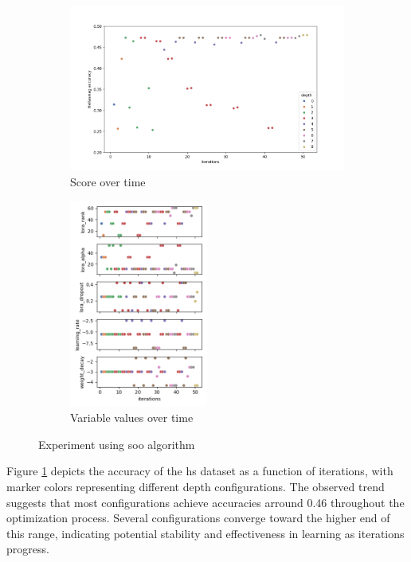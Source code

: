 \begin{figure}[h!]
    \centering
    \begin{subfigure}[b]{.5\textwidth}
      \centering
      \includegraphics[width = \textwidth]{figures/soo/score_evolution.png}
      \caption{Score over time}
      \label{fig:soo_score_time}
    \end{subfigure}%
    \begin{subfigure}[b]{.4\textwidth}
      \centering
      \includegraphics[width = 0.5\textwidth]{figures/soo/variables_evolution.png}
      \caption{Variable values over time}
      \label{fig:soo_var_time}
    \end{subfigure}
    \caption{Experiment using \acrshort{soo} algorithm}
    \label{fig:soo_res}
\end{figure}


Figure \ref{fig:soo_score_time} depicts the accuracy of the \gls{hs} dataset as a function of iterations, with marker colors representing different depth configurations. The observed trend suggests that most configurations achieve accuracies arround 0.46 throughout the optimization process. Several configurations converge toward the higher end of this range, indicating potential stability and effectiveness in learning as iterations progress. 

